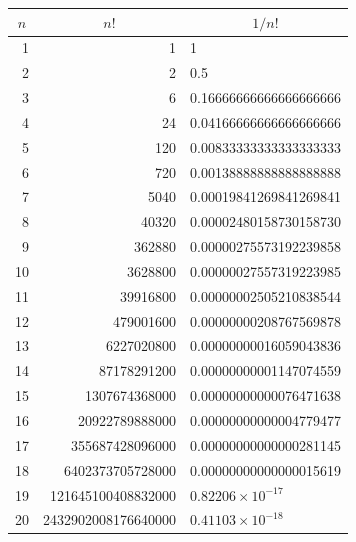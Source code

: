 \noindent\begin{minipage}[t]{0.68\textwidth}
\centering\fontsize{7.5pt}{9pt}\selectfont\renewcommand{\arraystretch}{1.0}\setlength{\tabcolsep}{3.5pt}
\begin{tabular}{|r|r|l|}
\hline
\multicolumn{1}{|c|}{$n$} & \multicolumn{1}{c|}{$n!$} & \multicolumn{1}{c|}{$1/n!$} \\ \hline
1 & 1 & 1 \\
2 & 2 & 0.5 \\
3 & 6 & 0.16666666666666666666 \\
4 & 24 & 0.04166666666666666666 \\
5 & 120 & 0.00833333333333333333 \\
6 & 720 & 0.00138888888888888888 \\
7 & 5040 & 0.00019841269841269841 \\
8 & 40320 & 0.00002480158730158730 \\
9 & 362880 & 0.00000275573192239858 \\
10 & 3628800 & 0.00000027557319223985 \\
11 & 39916800 & 0.00000002505210838544 \\
12 & 479001600 & 0.00000000208767569878 \\
13 & 6227020800 & 0.00000000016059043836 \\
14 & 87178291200 & 0.00000000001147074559 \\
15 & 1307674368000 & 0.00000000000076471638 \\
16 & 20922789888000 & 0.00000000000004779477 \\
17 & 355687428096000 & 0.00000000000000281145 \\
18 & 6402373705728000 & 0.00000000000000015619 \\
19 & 121645100408832000 & $0.82206 \times 10^{-17}$ \\
20 & 2432902008176640000 & $0.41103 \times 10^{-18}$ \\
\hline
\end{tabular}
\end{minipage}\hfill
